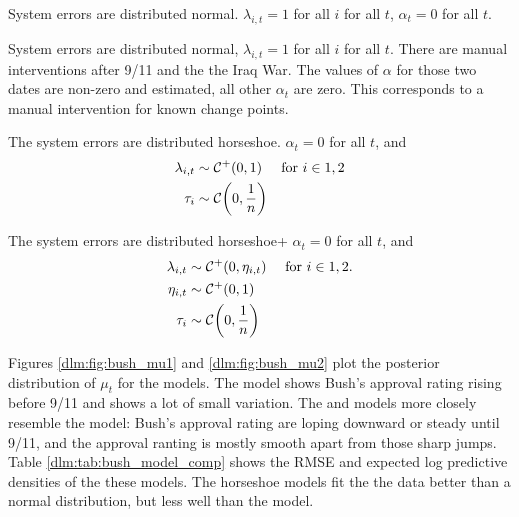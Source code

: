 \begin{description}[font = \normalfont\ModelII]
\item[Normal]
  System errors are distributed normal.
  $\lambda_{i, t} = 1$  for all $i$ for all $t$, $\alpha_{t} = 0$ for all $t$.
\item[Intervention]
  System errors are distributed normal, $\lambda_{i, t} = 1$  for all $i$ for all $t$.
  There are manual interventions after 9/11 and the the Iraq War. 
  The values of $\alpha$ for those two dates are non-zero and estimated, all other $\alpha_{t}$ are zero.
  This corresponds to a manual intervention for known change points.
\item[Horseshoe] The system errors are distributed horseshoe. $\alpha_{t} = 0$ for all $t$, and 
  \begin{equation}
    \label{dlm:eq:27}
    \begin{aligned}[t]
    \lambda_{i, t} & \sim \mathcal{C^+}\mathopen{}\left(0, 1\right)\mathclose{} & \text{for $i \in 1, 2$} \\
    \tau_{i} & \sim \mathcal{C}\mathopen{}\left(0, \frac{1}{n}\right)\mathclose{}
    \end{aligned}
  \end{equation}
\item[Horseshoe+] The system errors are distributed horseshoe+ $\alpha_{t}= 0$ for all $t$, and
  \begin{equation}
    \label{dlm:eq:25}
    \begin{aligned}
    \lambda_{i, t} & \sim \mathcal{C^+}\mathopen{}\left(0, \eta_{i, t}\right)\mathclose{} &&\text{  for $i \in 1, 2$.} \\
    \eta_{i, t} & \sim \mathcal{C^+}\mathopen{}\left(0, 1\right)\mathclose{} \\
    \tau_{i} & \sim \mathcal{C}\mathopen{}\left(0, \frac{1}{n}\right)\mathclose{}
    \end{aligned}
  \end{equation}
\end{description}


Figures \ref{dlm:fig:bush_mu1} and \ref{dlm:fig:bush_mu2} plot the posterior distribution of $\mu_{t}$ for the models.
The  model shows Bush's approval rating rising before 9/11 and shows a lot of small variation.
The  and  models more closely resemble the  model:
Bush's approval rating are loping downward or steady until 9/11, and the approval ranting is mostly smooth apart from those sharp jumps.
Table \ref{dlm:tab:bush_model_comp} shows the RMSE and expected log predictive densities of the these models. 
The horseshoe models fit the the data better than a normal distribution, but less well than the  model.

